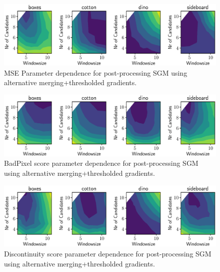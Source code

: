 \documentclass  [
  paper    = a4,
  BCOR     = 10mm,
  twoside,
  fontsize = 12pt,
  fleqn,
  toc      = bibnumbered,
  toc      = listofnumbered,
  numbers  = noendperiod,
  headings = normal,
  listof   = leveldown,
  version  = 3.03
]                                       {scrreprt}
\begin{document}
\begin{figure}
	\centering
	\includegraphics[width=1\linewidth]{images/choose_lower_sgm_ppr_contour_mse_100}
	\caption[Parameter dependence for post-processing SGM using alternative merging+thresholded gradients.]{MSE Parameter dependence for post-processing SGM using alternative merging+thresholded gradients.}
	\label{fig:chooselowersgmpprcontourmse100}
\end{figure}

\begin{figure}
	\centering
	\includegraphics[width=1\linewidth]{images/choose_lower_sgm_ppr_contour_badpix_0070}
	\caption[BadPixel Parameter dependence for post-processing SGM using alternative merging+thresholded gradients.]{BadPixel score parameter dependence for post-processing SGM using alternative merging+thresholded gradients.}
	\label{fig:chooselowersgmpprcontourbadpix_0070}
\end{figure}

\begin{figure}
	\centering
	\includegraphics[width=1\linewidth]{images/choose_lower_sgm_ppr_contour_discontinuities_0070}
	\caption[Discontinuity score Parameter dependence for post-processing SGM using alternative merging+thresholded gradients.]{Discontinuity score parameter dependence for post-processing SGM using alternative merging+thresholded gradients.}
	\label{fig:chooselowersgmpprcontourbadpixel_discontinuities0070}
\end{figure}
\end{document}
